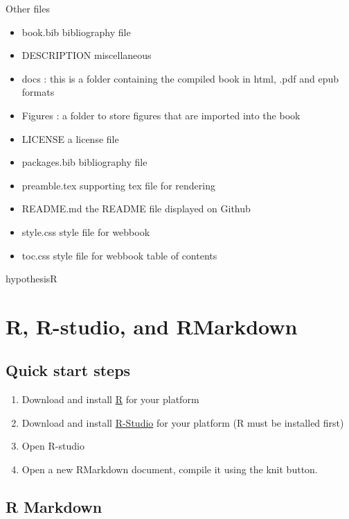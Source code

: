 \documentclass[
]{book}
\providecommand{\tightlist}{%
  \setlength{\itemsep}{0pt}\setlength{\parskip}{0pt}}
\begin{document}
Other files

\begin{itemize}
\tightlist
\item
  book.bib bibliography file
\item
  DESCRIPTION miscellaneous
\item
  docs : this is a folder containing the compiled book in html, .pdf and epub formats
\item
  Figures : a folder to store figures that are imported into the book
\item
  LICENSE a license file
\item
  packages.bib bibliography file
\item
  preamble.tex supporting tex file for rendering
\item
  README.md the README file displayed on Github
\item
  style.css style file for webbook
\item
  toc.css style file for webbook table of contents
\end{itemize}

hypothesisR

\hypertarget{r-r-studio-and-rmarkdown}{%
\chapter{R, R-studio, and RMarkdown}\label{r-r-studio-and-rmarkdown}}

\hypertarget{quick-start-steps}{%
\section{Quick start steps}\label{quick-start-steps}}

\begin{enumerate}
\def\labelenumi{\arabic{enumi}.}
\tightlist
\item
  Download and install \href{https://www.r-project.org}{R} for your platform
\item
  Download and install \href{https://www.rstudio.com}{R-Studio} for your platform (R must be installed first)
\item
  Open R-studio
\item
  Open a new RMarkdown document, compile it using the knit button.
\end{enumerate}

\hypertarget{r-markdown}{%
\section{R Markdown}\label{r-markdown}}
\end{document}
